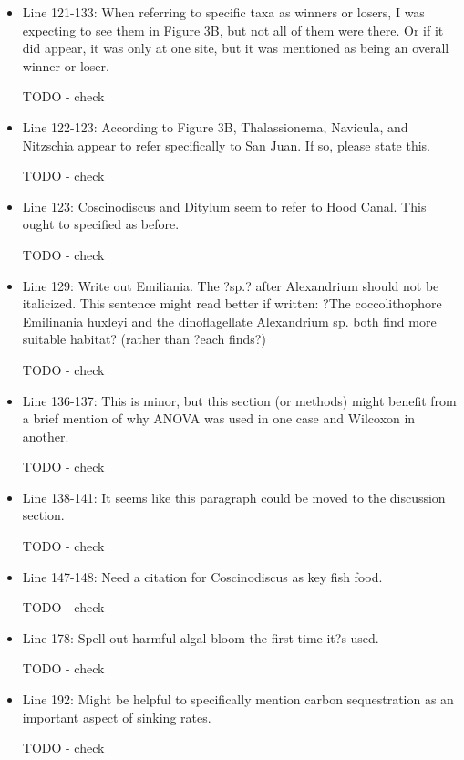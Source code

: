 \documentclass[11pt]{article}
\begin{document}
\begin{linenumbers}
\begin{itemize}
\item{Line 121-133: When referring to specific taxa as winners or losers, I was expecting to see them in Figure 3B, but not all of them were there. Or if it did appear, it was only at one site, but it was mentioned as being an overall winner or loser.}

{\color{red} TODO - check }

\item{Line 122-123: According to Figure 3B, Thalassionema, Navicula, and Nitzschia appear to refer specifically to San Juan. If so, please state this.}

{\color{red} TODO - check }


\item{Line 123: Coscinodiscus and Ditylum seem to refer to Hood Canal. This ought to specified as before.}

{\color{red} TODO - check }


\item{Line 129: Write out Emiliania. The ?sp.? after Alexandrium should not be italicized. This sentence might read better if written: ?The coccolithophore Emilinania huxleyi and the dinoflagellate Alexandrium sp. both find more suitable habitat? (rather than ?each finds?)}

{\color{red} TODO - check }


\item{Line 136-137: This is minor, but this section (or methods) might benefit from a brief mention of why ANOVA was used in one case and Wilcoxon in another.}

{\color{red} TODO - check }


\item{Line 138-141: It seems like this paragraph could be moved to the discussion section.}

{\color{red} TODO - check }


\item{Line 147-148: Need a citation for Coscinodiscus as key fish food.}

{\color{red} TODO - check }


\item{Line 178: Spell out harmful algal bloom the first time it?s used.}

{\color{red} TODO - check }


\item{Line 192: Might be helpful to specifically mention carbon sequestration as an important aspect of sinking rates.}

{\color{red} TODO - check }



\end{itemize}
\end{linenumbers}
\end{document}
